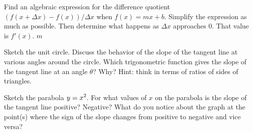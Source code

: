\exercise
Find an algebraic expression for the difference quotient $(f(x+\Delta
x)-f(x))/\Delta x$ when $f(x)=mx+b$.  Simplify the expression as
much as possible.  Then determine what happens as $\Delta x$ approaches 0.
That value is $f'(x)$.
\answer $m$
\endanswer
{}
\endexercise

\exercise Sketch the unit circle.  Discuss the behavior of the slope
of the tangent line at various angles around the circle.  Which
trigonometric function gives the slope of the tangent line at an angle
$\theta$?  Why? Hint: think in terms of ratios of sides of
  triangles.
\endexercise

\exercise Sketch the parabola $\displaystyle y=x^2$.  For what values of $x$ on
the parabola is the slope of the tangent line positive?  Negative?
What do you notice about the graph at the point(s) where the sign of
the slope changes from positive to negative and vice versa?
\endexercise

\endexercises
